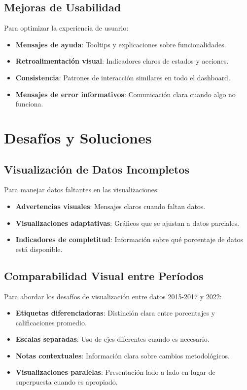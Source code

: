 \subsection{Mejoras de Usabilidad}
Para optimizar la experiencia de usuario:

\begin{itemize}
    \item \textbf{Mensajes de ayuda}: Tooltips y explicaciones sobre funcionalidades.
    \item \textbf{Retroalimentación visual}: Indicadores claros de estados y acciones.
    \item \textbf{Consistencia}: Patrones de interacción similares en todo el dashboard.
    \item \textbf{Mensajes de error informativos}: Comunicación clara cuando algo no funciona.
\end{itemize}

\section{Desafíos y Soluciones}

\subsection{Visualización de Datos Incompletos}
Para manejar datos faltantes en las visualizaciones:

\begin{itemize}
    \item \textbf{Advertencias visuales}: Mensajes claros cuando faltan datos.
    \item \textbf{Visualizaciones adaptativas}: Gráficos que se ajustan a datos parciales.
    \item \textbf{Indicadores de completitud}: Información sobre qué porcentaje de datos está disponible.
\end{itemize}

\subsection{Comparabilidad Visual entre Períodos}
Para abordar los desafíos de visualización entre datos 2015-2017 y 2022:

\begin{itemize}
    \item \textbf{Etiquetas diferenciadoras}: Distinción clara entre porcentajes y calificaciones promedio.
    \item \textbf{Escalas separadas}: Uso de ejes diferentes cuando es necesario.
    \item \textbf{Notas contextuales}: Información clara sobre cambios metodológicos.
    \item \textbf{Visualizaciones paralelas}: Presentación lado a lado en lugar de superpuesta cuando es apropiado.
\end{itemize}

